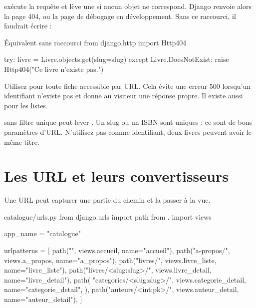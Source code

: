  exécute la requête et lève une  si aucun
objet ne correspond. Django renvoie alors la page 404, ou la page de débogage en
développement. Sans ce raccourci, il faudrait écrire :

\begin{codebox}[python]{Équivalent sans raccourci}
from django.http import Http404

try:
    livre = Livre.objects.get(slug=slug)
except Livre.DoesNotExist:
    raise Http404("Ce livre n'existe pas.")
\end{codebox}

\begin{bonne}
Utilisez  pour toute fiche accessible par URL. Cela
évite une erreur 500 lorsqu'un identifiant n'existe pas et donne au visiteur une
réponse propre. Il existe aussi  pour les listes.
\end{bonne}

\begin{attention}
 sans filtre unique peut lever . Un slug
ou un ISBN sont uniques : ce sont de bons paramètres d'URL. N'utilisez pas
 comme identifiant, deux livres peuvent avoir le même titre.
\end{attention}

\section{Les URL et leurs convertisseurs}

Une URL peut capturer une partie du chemin et la passer à la vue.

\begin{codebox}[python]{catalogue/urls.py}
from django.urls import path
from . import views

app_name = "catalogue"

urlpatterns = [
    path("", views.accueil, name="accueil"),
    path("a-propos/", views.a_propos, name="a_propos"),
    path("livres/", views.livre_liste, name="livre_liste"),
    path("livres/<slug:slug>/", views.livre_detail, name="livre_detail"),
    path(
        "categories/<slug:slug>/",
        views.categorie_detail,
        name="categorie_detail",
    ),
    path("auteurs/<int:pk>/", views.auteur_detail, name="auteur_detail"),
]
\end{codebox}

